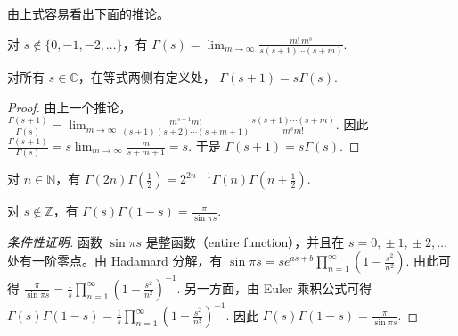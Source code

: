 由上式容易看出下面的推论。

\begin{corollary}[原文 Corollary 7.2]
	对 $s\notin\{0,-1,-2,\ldots\}$，有
	\(\textstyle \Gamma(s) =\allowbreak{} \lim_{m\to\allowbreak{}\infty} \frac{m!\,m^s}{s(s+\allowbreak{}1)\cdots(s+\allowbreak{}m)}.\)
\end{corollary}

\begin{theorem}
	对所有 $s\in\mathbb C$，在等式两侧有定义处，
	\(\textstyle \Gamma(s+\allowbreak{}1)=\allowbreak{}s\Gamma(s).\)
\end{theorem}

\begin{proof}
	由上一个推论，
	\(\textstyle \frac{\Gamma(s+\allowbreak{}1)}{\Gamma(s)} =\allowbreak{} \lim_{m\to\allowbreak{}\infty} \frac{m^{s+\allowbreak{}1}m!}{(s+\allowbreak{}1)(s+\allowbreak{}2)\cdots(s+\allowbreak{}m+\allowbreak{}1)} \frac{s(s+\allowbreak{}1)\cdots(s+\allowbreak{}m)}{m^s m!}.\)
	因此
	\(\textstyle \frac{\Gamma(s+\allowbreak{}1)}{\Gamma(s)} =\allowbreak{} s\lim_{m\to\allowbreak{}\infty}\frac{m}{s+\allowbreak{}m+\allowbreak{}1} =\allowbreak{} s.\)
	于是
	\(\textstyle \Gamma(s+\allowbreak{}1)=\allowbreak{}s\Gamma(s).\)
\end{proof}

\begin{corollary}
	对 $n\in\mathbb N$，有
	\(\textstyle \Gamma(2n)\Gamma\left(\frac12\right) =\allowbreak{} 2^{2n-1}\Gamma(n)\Gamma\left(n+\allowbreak{}\frac12\right).\)
\end{corollary}

\begin{theorem}
	对 $s\notin\mathbb Z$，有
	\(\textstyle \Gamma(s)\Gamma(1-s) =\allowbreak{} \frac{\pi}{\sin \pi s}.\)
\end{theorem}

\begin{proof}[条件性证明]
	函数 $\sin \pi s$ 是整函数（entire function），并且在
	\(\textstyle s=\allowbreak{}0,\allowbreak{}\pm1,\allowbreak{}\pm2,\allowbreak{}\ldots\)
	处有一阶零点。由 Hadamard 分解，有
	\(\textstyle \sin\pi s =\allowbreak{} s e^{as+\allowbreak{}b} \prod_{n=\allowbreak{}1}^{\infty} \left(1-\frac{s^2}{n^2}\right).\)
	由此可得
	\(\textstyle \frac{\pi}{\sin \pi s} =\allowbreak{} \frac{1}{s} \prod_{n=\allowbreak{}1}^{\infty} \left(1-\frac{s^2}{n^2}\right)^{-1}.\)
	另一方面，由 Euler 乘积公式可得
	\(\textstyle \Gamma(s)\Gamma(1-s) =\allowbreak{} \frac{1}{s} \prod_{n=\allowbreak{}1}^{\infty} \left(1-\frac{s^2}{n^2}\right)^{-1}.\)
	因此
	\(\textstyle \Gamma(s)\Gamma(1-s)=\allowbreak{}\frac{\pi}{\sin\pi s}.\)
\end{proof}

